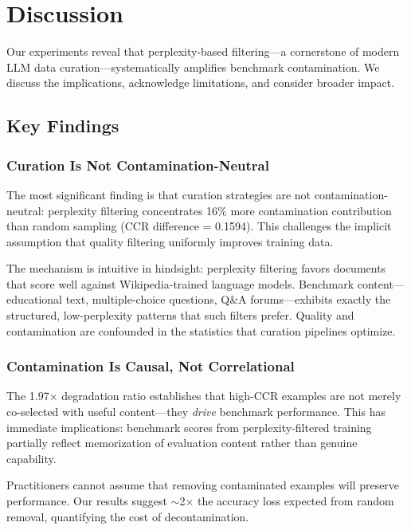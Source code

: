 \section{Discussion}

Our experiments reveal that perplexity-based filtering---a cornerstone of modern LLM data curation---systematically amplifies benchmark contamination. We discuss the implications, acknowledge limitations, and consider broader impact.

\subsection{Key Findings}

\subsubsection{Curation Is Not Contamination-Neutral}

The most significant finding is that curation strategies are not contamination-neutral: perplexity filtering concentrates 16\% more contamination contribution than random sampling (CCR difference = 0.1594). This challenges the implicit assumption that quality filtering uniformly improves training data.

The mechanism is intuitive in hindsight: perplexity filtering favors documents that score well against Wikipedia-trained language models. Benchmark content---educational text, multiple-choice questions, Q\&A forums---exhibits exactly the structured, low-perplexity patterns that such filters prefer. Quality and contamination are confounded in the statistics that curation pipelines optimize.

\subsubsection{Contamination Is Causal, Not Correlational}

The 1.97$\times$ degradation ratio establishes that high-CCR examples are not merely co-selected with useful content---they \textit{drive} benchmark performance. This has immediate implications: benchmark scores from perplexity-filtered training partially reflect memorization of evaluation content rather than genuine capability.

Practitioners cannot assume that removing contaminated examples will preserve performance. Our results suggest $\sim$2$\times$ the accuracy loss expected from random removal, quantifying the cost of decontamination.

